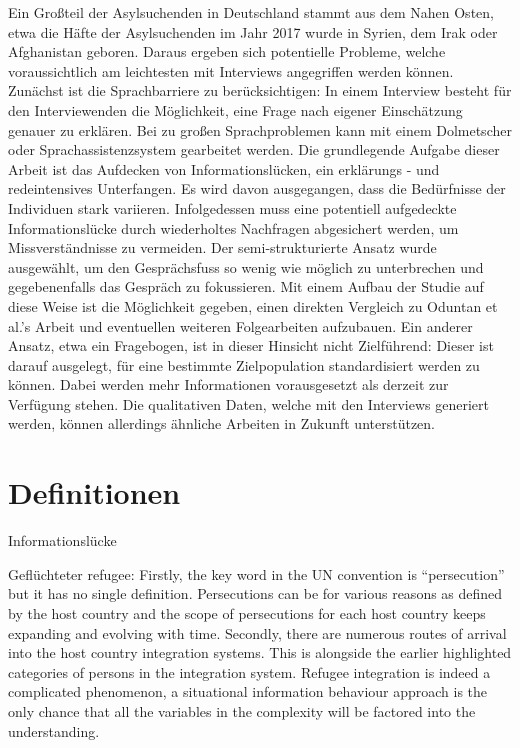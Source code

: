 \documentclass[12pt,oneside]{article}
\begin{document}
Ein Gro\ss{}teil der Asylsuchenden in Deutschland stammt aus dem Nahen Osten, etwa die H\"afte der Asylsuchenden im Jahr 2017 wurde in Syrien, dem Irak oder Afghanistan geboren\cite{asylum2017seekers}. Daraus ergeben sich potentielle Probleme, welche voraussichtlich am leichtesten mit Interviews angegriffen werden k\"onnen.
Zun\"achst ist die Sprachbarriere zu ber\"ucksichtigen: In einem Interview besteht f\"ur den Interviewenden die M\"oglichkeit, eine Frage nach eigener Einsch\"atzung genauer zu erkl\"aren. Bei zu gro\ss{}en Sprachproblemen kann mit einem Dolmetscher oder Sprachassistenzsystem gearbeitet werden.\newline
Die grundlegende Aufgabe dieser Arbeit ist das Aufdecken von Informationsl\"ucken, ein erkl\"arungs - und redeintensives Unterfangen. Es wird davon ausgegangen, dass die Bed\"urfnisse der Individuen stark variieren. Infolgedessen muss eine potentiell aufgedeckte Informationsl\"ucke durch wiederholtes Nachfragen abgesichert werden, um Missverst\"andnisse zu vermeiden.\newline
Der semi-strukturierte Ansatz wurde ausgew\"ahlt, um den Gespr\"achsfuss so wenig wie m\"oglich zu unterbrechen und gegebenenfalls das Gespr\"ach zu fokussieren.\newline
Mit einem Aufbau der Studie auf diese Weise ist die M\"oglichkeit gegeben, einen direkten Vergleich zu Oduntan et al.'s Arbeit und eventuellen weiteren Folgearbeiten aufzubauen.\newline
Ein anderer Ansatz, etwa ein Fragebogen, ist in dieser Hinsicht nicht Zielf\"uhrend: Dieser ist darauf ausgelegt, f\"ur eine bestimmte Zielpopulation standardisiert werden zu k\"onnen. Dabei werden mehr Informationen vorausgesetzt als derzeit zur Verf\"ugung stehen.\newline
Die qualitativen Daten, welche mit den Interviews generiert werden, k\"onnen allerdings \"ahnliche Arbeiten in Zukunft unterst\"utzen.\newline

\section{Definitionen}

Informationslücke

Geflüchteter
refugee:
Firstly, the key word in the UN convention is “persecution”
but it has no single definition. Persecutions can be for
various reasons as defined by the host country and the
scope of persecutions for each host country keeps
expanding and evolving with time. Secondly, there are
numerous routes of arrival into the host country integration
systems. This is alongside the earlier highlighted categories
of persons in the integration system. Refugee integration is
indeed a complicated phenomenon, a situational
information behaviour approach is the only chance that all
the variables in the complexity will be factored into the
understanding.
\end{document}
